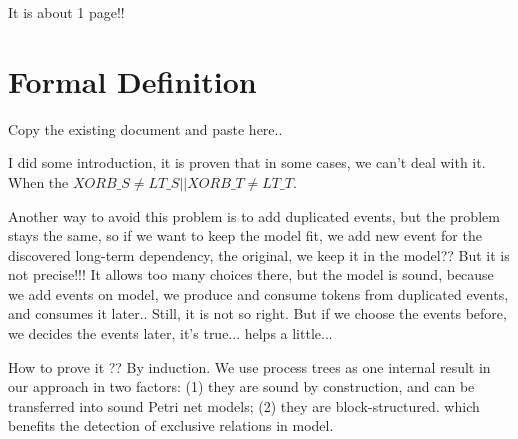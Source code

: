 \documentclass[]{article}
\begin{document}
It is about 1 page!!

\section{Formal Definition}
Copy the existing document and paste here.. 

I did some introduction, it is proven that in some cases, we can't deal with it. When the $XORB\_S \neq LT\_S || XORB\_T \neq LT\_T$.

Another way to avoid this problem is to add duplicated events, but the problem stays the same, so if we want to keep the model fit, we add new event for the discovered long-term dependency, the original, we keep it in the model?? But it is not precise!!! It allows too many choices there, but the model is sound, because we add events on model, we produce and consume tokens from duplicated events, and consumes it later.. Still, it is not so right. But if we choose the events before, we decides the events later, it's true... helps a little... 

How to prove it ?? By induction. 
We use  process  trees as one internal result in  our  approach in two factors: (1) they are sound by construction, and can be transferred into sound Petri net models; (2) they are block-structured. which benefits the detection of exclusive relations in model.
\end{document}
